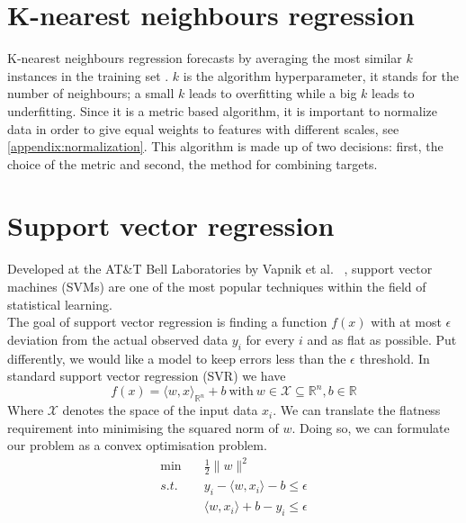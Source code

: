\section{K-nearest neighbours regression}
K-nearest neighbours regression forecasts by averaging the most similar $k$ instances in the training set \cite{macqueen1967some}. $k$ is the algorithm hyperparameter, it stands for the number of neighbours; a small $k$ leads to overfitting while a big $k$ leads to underfitting. 
Since it is a metric based algorithm, it is important to normalize data in order to give equal weights to features with different scales, see \ref{appendix:normalization}.
This algorithm is made up of two decisions: first, the choice of the metric and second, the method for combining targets.


\section{Support vector regression}
Developed at the AT\&T Bell Laboratories by Vapnik et al.\ \cite{cortes1995support} \cite{vapnik1997support}, support vector machines (SVMs) are one of the most popular techniques within the field of statistical learning.
\\
The goal of support vector regression is finding a function $f(x)$ with at most $\epsilon$ deviation from the actual observed data $y_i$ for every $i$ and as flat as possible. 
Put differently, we would like a model to keep errors less than the $\epsilon$ threshold.  
In standard support vector regression (SVR) we have
\begin{equation}
    f(x)=\langle w,x \rangle_{\mathbb{R}^n} +b \ \textrm{with} \ w \in \mathcal{X} \subseteq \mathbb{R}^n, b \in \mathbb{R}
\end{equation}
Where $\mathcal{X}$ denotes the space of the input data $x_i$.
We can translate the flatness requirement into minimising the squared norm of $w$. Doing so, we can formulate our problem as a convex optimisation problem.
\begin{equation}
    \begin{aligned}
        \min \quad& \frac{1}{2}\|w\|^2
        \\
        s.t. \quad& y_i-\langle w, x_i\rangle-b\leq \epsilon
        \\
        \quad& \langle w, x_i\rangle +b-y_i\leq \epsilon
    \end{aligned}
\end{equation}
